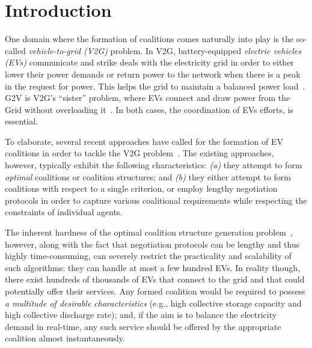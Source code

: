 
\chapter{Introduction} %

\label{Chapter1} %


One domain where the formation of coalitions comes naturally into play is the so-called {\em vehicle-to-grid (V2G)} problem. In V2G, battery-equipped {\em electric vehicles (EVs)} communicate and strike deals with the electricity grid in order to either lower their power demands or return power to the network when there is a peak in the request for power. This helps the grid to maintain 
a balanced power load~\cite{ramchurn2012putting}. 
G2V is V2G's ``sister'' problem, where EVs connect and draw power from the Grid without overloading it~\cite{valogianni2014effective}. 
In both cases, the coordination of EVs efforts, is essential.

To elaborate, several recent approaches have called for the formation of EV coalitions in order to tackle the V2G problem~\cite{deORamos2014,kamboj2010exploring,kamboj2011deploying}.
The existing approaches, however, typically exhibit the following characteristics: {\em (a)} they attempt to form {\em optimal} coalitions or coalition structures; and {\em (b)} they either attempt to form coalitions with respect to a single criterion, or employ lengthy negotiation protocols in order to capture various coalitional requirements while respecting the constraints of individual agents. 

The inherent hardness of the optimal coalition structure generation problem~\cite{rahwan2009anytime}, however, along with the fact that negotiation protocols can be lengthy and thus highly time-consuming, can severely restrict the practicality and scalability of such algorithms: they can handle at most a few hundred EVs. In reality though, there exist hundreds of thousands of EVs that connect to the grid and that could potentially offer their services. Any formed coalition would be required to possess {\em a multitude of desirable characteristics} (e.g., high collective storage capacity and high collective discharge rate); and, if the aim is to balance the electricity demand in real-time, any such service should be offered by the appropriate coalition almost instantaneously.

